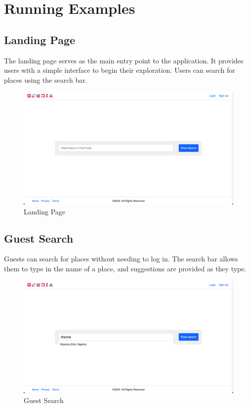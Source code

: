 \chapter{Running Examples}

\section{Landing Page}
The landing page serves as the main entry point to the application. It provides users with a simple interface to begin their exploration. Users can search for places using the search bar.

\begin{figure}[H]
    \centering
    \includegraphics[width=\textwidth]{landingPage.png}
    \caption{Landing Page}
    \label{fig:landingPage}
\end{figure}

\section{Guest Search}
Guests can search for places without needing to log in. The search bar allows them to type in the name of a place, and suggestions are provided as they type.

\begin{figure}[H]
    \centering
    \includegraphics[width=\textwidth]{guestSearch.png}
    \caption{Guest Search}
    \label{fig:guestSearch}
\end{figure}


